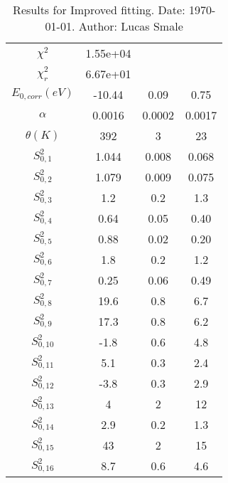 \documentclass{article}
\begin{document}
\begin{landscape}
\begin{table}[ht]
\begin{tabular}{c||c|c|c}
\hline
$\chi^2$   & 1.55e+04 & & \\
$\chi^2_r$ & 6.67e+01 & & \\
\hline
$E_{0,corr} (eV)$& -10.44 & 0.09 & 0.75 \\
$\alpha $       & 0.0016 & 0.0002 & 0.0017 \\
$\theta (K) $   & 392 & 3 & 23 \\
$S^2_{0,1}$& 1.044 & 0.008 & 0.068 \\
$S^2_{0,2}$& 1.079 & 0.009 & 0.075 \\
$S^2_{0,3}$& 1.2 & 0.2 & 1.3 \\
$S^2_{0,4}$& 0.64 & 0.05 & 0.40 \\
$S^2_{0,5}$& 0.88 & 0.02 & 0.20 \\
$S^2_{0,6}$& 1.8 & 0.2 & 1.2 \\
$S^2_{0,7}$& 0.25 & 0.06 & 0.49 \\
$S^2_{0,8}$& 19.6 & 0.8 & 6.7 \\
$S^2_{0,9}$& 17.3 & 0.8 & 6.2 \\
$S^2_{0,10}$& -1.8 & 0.6 & 4.8 \\
$S^2_{0,11}$& 5.1 & 0.3 & 2.4 \\
$S^2_{0,12}$& -3.8 & 0.3 & 2.9 \\
$S^2_{0,13}$& 4 & 2 & 12 \\
$S^2_{0,14}$& 2.9 & 0.2 & 1.3 \\
$S^2_{0,15}$& 43 & 2 & 15 \\
$S^2_{0,16}$& 8.7 & 0.6 & 4.6 \\
\hline
\end{tabular}
 \caption{Results for Improved fitting. Date: \today. Author: Lucas Smale}
\end{table}
\end{landscape}
\end{document}
